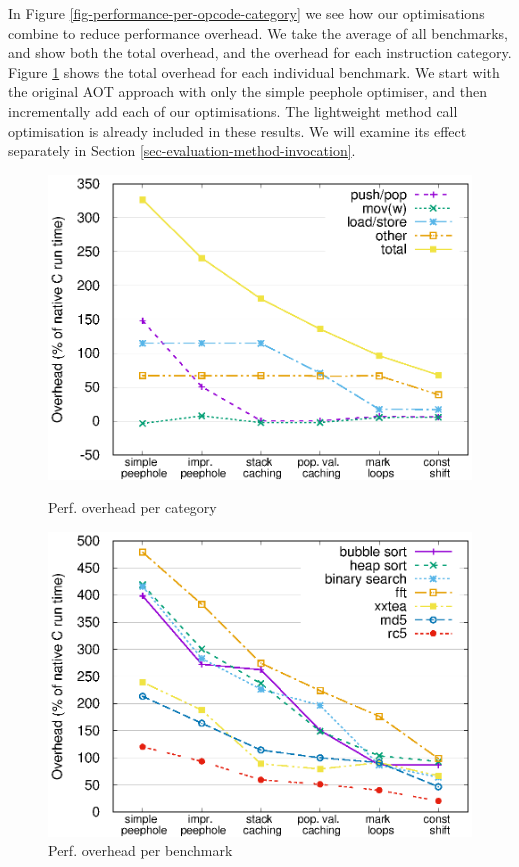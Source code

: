 In Figure \ref{fig-performance-per-opcode-category} we see how our optimisations combine to reduce performance overhead. We take the average of all benchmarks, and show both the total overhead, and the overhead for each instruction category. Figure \ref{fig-performance-per-benchmark} shows the total overhead for each individual benchmark. We start with the original AOT approach with only the simple peephole optimiser, and then incrementally add each of our optimisations. The lightweight method call optimisation is already included in these results. We will examine its effect separately in Section \ref{sec-evaluation-method-invocation}.

\begin{figure}
 \centering
 \begin{minipage}{0.45\textwidth}
  \centering
  \includegraphics[width=\myfiguresizeperformance]{performance-per-opcode-category.eps}
  \caption{Perf. overhead per category}
  \label{fig-performance-per-opcode-category}
 \end{minipage}\hfill
 \begin{minipage}{0.45\textwidth}
  \centering
  \includegraphics[width=\myfiguresizeperformance]{performance-per-benchmark.eps}
  \caption{Perf. overhead per benchmark}
  \label{fig-performance-per-benchmark}
 \end{minipage}
\end{figure}

